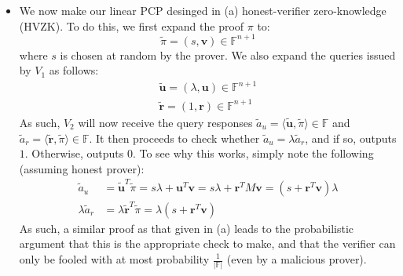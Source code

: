\documentclass[12pt]{exam}
\begin{document}
\begin{questions}
\begin{solution}
\begin{enumerate}[label=\textbf{\alph*.}]
\begin{itemize}
      \item We now make our linear PCP desinged in (a) honest-verifier zero-knowledge (HVZK). To do this, we first expand the proof $\pi$ to:
      \[
        \tilde{\pi} = (s, \textbf{v}) \in \mathbb{F}^{n+1}
      \] 
      where $s$ is chosen at random by the prover. We also expand the queries issued by $V_1$ as follows:
      \begin{align*}
        \tilde{\textbf{u}} = (\lambda, \textbf{u}) \in \mathbb{F}^{n+1} \\
        \tilde{\textbf{r}} = (1, \textbf{r}) \in \mathbb{F}^{n+1}
      \end{align*}
      As such, $V_2$ will now receive the query responses $\tilde{a}_u = \langle \tilde{\textbf{u}}, \tilde{\pi} \rangle \in \mathbb{F} $ and $\tilde{a}_r = \langle \tilde{\textbf{r}}, \tilde{\pi} \rangle  \in \mathbb{F}$. It then proceeds to check whether $\tilde{a}_u = \lambda \tilde{a}_r$, and if so, outputs $1$. Otherwise, outputs $0$. To see why this works, simply note the following (assuming honest prover):
      \begin{align*}
        \tilde{a}_u &= \tilde{\textbf{u}}^T\tilde{\pi} = s \lambda + \textbf{u}^T\textbf{v} = s\lambda + \textbf{r}^TM\textbf{v} = (s + \textbf{r}^T\textbf{v})\lambda \\
        \lambda \tilde{a}_r &= \lambda \tilde{\textbf{r}}^T \tilde{\pi} = \lambda(s + \textbf{r}^T\textbf{v})
      \end{align*}
      As such, a similar proof as that given in (a) leads to the probabilistic argument that this is the appropriate check to make, and that the verifier can only be fooled with at most probability $\frac{1}{|\mathbb{F}|}$ (even by a malicious prover).



\end{itemize}
\end{enumerate}
\end{solution}
\end{questions}
\end{document}

